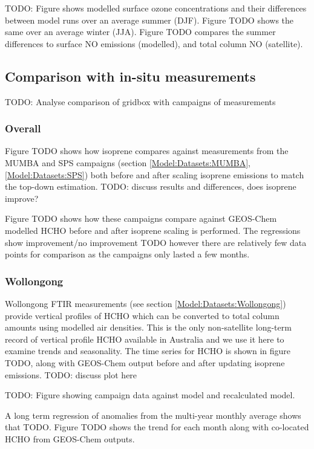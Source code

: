       TODO: Figure shows modelled surface ozone concentrations and their differences between model runs over an average summer (DJF). 
      Figure TODO shows the same over an average winter (JJA).
      Figure TODO compares the summer differences to surface NO emissions (modelled), and total column NO (satellite).
  
  \subsection{Comparison with in-situ measurements}
    
    TODO: %
    Analyse comparison of gridbox with campaigns of measurements
    
    \subsubsection{Overall}
      
      Figure TODO shows how isoprene compares against measurements from the MUMBA and SPS campaigns (section \ref{Model:Datasets:MUMBA}, \ref{Model:Datasets:SPS}) both before and after scaling isoprene emissions to match the top-down estimation.
      TODO: discuss results and differences, does isoprene improve?
      
      Figure TODO shows how these campaigns compare against GEOS-Chem modelled HCHO before and after isoprene scaling is performed. The regressions show improvement/no improvement TODO however there are relatively few data points for comparison as the campaigns only lasted a few months.
    
    \subsubsection{Wollongong}
      Wollongong FTIR measurements (see section \ref{Model:Datasets:Wollongong}) provide vertical profiles of HCHO which can be converted to total column amounts using modelled air densities.
      This is the only non-satellite long-term record of vertical profile HCHO available in Australia and we use it here to examine trends and seasonality.
      The time series for HCHO is shown in figure TODO, along with GEOS-Chem output before and after updating isoprene emissions.
      TODO: discuss plot here
      
      TODO: Figure showing campaign data against model and recalculated model.
      
      A long term regression of anomalies from the multi-year monthly average shows that TODO.
      Figure TODO shows the trend for each month along with co-located HCHO from GEOS-Chem outputs.

